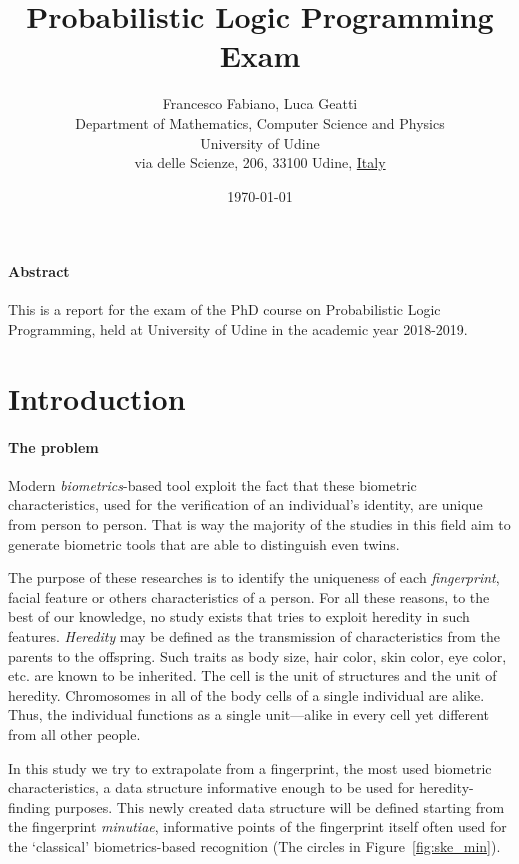 \documentclass[8pt]{article}
\title{Probabilistic Logic Programming Exam}
\author{
        Francesco Fabiano, Luca Geatti\\
        \footnotesize Department of Mathematics, Computer Science and Physics \\
        \footnotesize University of Udine\\
        \footnotesize via delle Scienze, 206, 33100 Udine, \underline{Italy}
}
\date{\footnotesize\today}
\begin{document}
\maketitle
\paragraph{Abstract}
This is a report for the exam of the PhD course on Probabilistic Logic
Programming, held at University of Udine in the academic year 2018-2019.



\section{Introduction}

  \paragraph{The problem}
    Modern \textit{biometrics}-based tool exploit the fact that these biometric characteristics, used for the verification of an individual’s identity, are unique from person to person.
    That is way the majority of the studies in this field aim to generate biometric tools that are able to distinguish even twins.
    
    The purpose of these researches is to identify the uniqueness of each \textit{fingerprint}, facial feature or others characteristics of a person.
    For all these reasons, to the best of our knowledge, no study exists that tries to exploit heredity in such features.
    \textit{Heredity} may be defined as the transmission of characteristics from the parents to the offspring.
    Such traits as body size, hair color, skin color, eye color, etc. are known to be inherited.
    The cell is the unit of structures and the unit of heredity.
    Chromosomes in all of the body cells of a single individual are alike.
    Thus, the individual functions as a single unit—alike in every cell yet different from all other people.
    
    In this study we try to extrapolate from a fingerprint, the most used biometric characteristics, a data structure informative enough to be used for heredity-finding purposes.
    This newly created data structure will be defined starting from the fingerprint \textit{minutiae}, informative points of the fingerprint itself often used for the \textquoteleft classical' biometrics-based recognition (The circles in Figure~\ref{fig:ske_min}).
\end{document}

